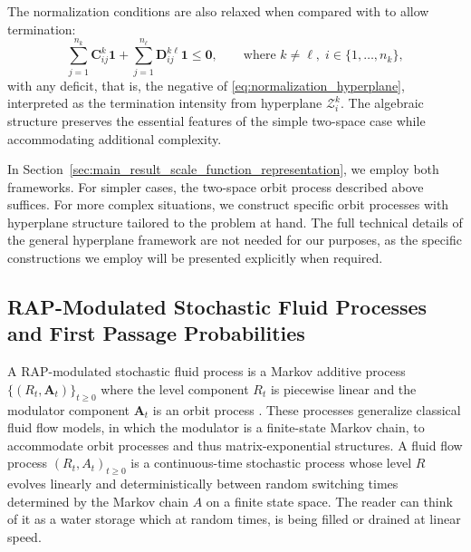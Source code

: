\documentclass[a4paper,11pt]{article}
\numberwithin{equation}{section}
\theoremstyle{plain}
\theoremstyle{definition}
\newcommand{\1}{\mathbf{1}}
\begin{document}
The normalization conditions are also relaxed when compared with \cite{BeanNguyenNielsenPeralta2022} to allow termination:
\begin{equation}\label{eq:normalization_hyperplane}
\sum_{j=1}^{n_k} \bm{C}_{ij}^k\bm{1} + \sum_{j=1}^{n_\ell} \bm{D}_{ij}^{k\ell}\bm{1} \le \bm{0},\qquad \text{where }k\neq \ell,\; i\in \{1,\ldots, n_k\},
\end{equation}
with any deficit, that is, the negative of \eqref{eq:normalization_hyperplane}, interpreted as the termination intensity from hyperplane $\mathcal{Z}_i^k$. The algebraic structure preserves the essential features of the simple two-space case while accommodating additional complexity.

In Section~\ref{sec:main_result_scale_function_representation}, we employ both frameworks. For simpler cases, the two-space orbit process described above suffices. For more complex situations, we construct specific orbit processes with hyperplane structure tailored to the problem at hand. The full technical details of the general hyperplane framework are not needed for our purposes, as the specific constructions we employ will be presented explicitly when required.

\subsection{RAP-Modulated Stochastic Fluid Processes and First Passage Probabilities}\label{subsectionRAPMSFP}
A RAP-modulated stochastic fluid process is a Markov additive process $\{(R_t, \bm{A}_t)\}_{t \ge 0}$ where the level component $R_t$ is piecewise linear and the modulator component $\bm{A}_t$ is an orbit process \citep{BeanNguyenNielsenPeralta2022}. These processes generalize classical fluid flow models, in which the modulator is a finite-state Markov chain, to accommodate orbit processes and thus matrix-exponential structures.
A fluid flow process $(R_t,A_t)_{t\geq 0}$ is a continuous-time stochastic process whose level $R$ evolves linearly and deterministically between random switching times determined by the Markov chain $A$ on a finite state space. The reader can think of it as a water storage which at random times, is being filled or drained at linear speed.
\end{document}
